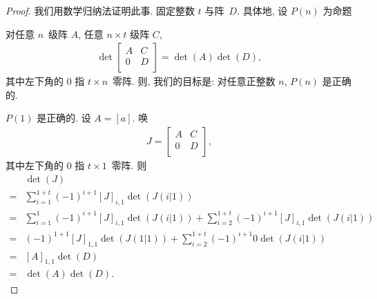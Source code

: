 \documentclass[%
    UTF8,%
    fontset=none,%
    punct=kaiming,%
    zihao=-4,%
    a4paper,%
    oneside,%
]{ctexbook}
\makeatletter
\renewenvironment{quotation}
{\list{}{\listparindent 2\ccwd%
\itemindent\listparindent
\leftmargin\rightmargin
\parsep\z@ \@plus\p@}%
\item\relax}
{\endlist}
\makeatother
\begin{document}
\begin{proof}
    我们用数学归纳法证明此事.
    固定整数 \(t\) 与阵~\(D\).
    具体地, 设 \(P(n)\) 为命题
    \begin{quotation}
        对任意 \(n\)~级阵 \(A\), 任意 \(n \times t\) 级阵 \(C\),
        \begin{align*}
            \det {
                \begin{bmatrix}
                    A & C \\
                    0 & D \\
                \end{bmatrix}
            }
            = \det {(A)} \det {(D)},
        \end{align*}
        其中左下角的 \(0\) 指 \(t \times n\)~零阵.
    \end{quotation}
    则, 我们的目标是:
    对任意正整数 \(n\), \(P(n)\) 是正确的.

    \(P(1)\) 是正确的.
    设 \(A = [a]\).
    唤
    \begin{align*}
        J =
        \begin{bmatrix}
            A & C \\
            0 & D \\
        \end{bmatrix},
    \end{align*}
    其中左下角的 \(0\) 指 \(t \times 1\)~零阵.
    则
    \begin{align*}
             & \det {(J)}
        \\
        = {} & \sum_{i = 1}^{1+t}
        {(-1)^{i+1} [J]_{i,1} \det {(J(i|1))}}
        \\
        = {} & \sum_{i = 1}^{1}
        {(-1)^{i+1} [J]_{i,1} \det {(J(i|1))}}
        +
        \sum_{i = 2}^{1+t}
        {(-1)^{i+1} [J]_{i,1} \det {(J(i|1))}}
        \\
        = {} &
        (-1)^{1+1} [J]_{1,1} \det {(J(1|1))}
        +
        \sum_{i = 2}^{1+t}
        {(-1)^{i+1} 0 \det {(J(i|1))}}
        \\
        = {} &
        [A]_{1,1} \det {(D)}
        \\
        = {} & \det {(A)} \det {(D)}.
    \end{align*}


\end{proof}
\end{document}

